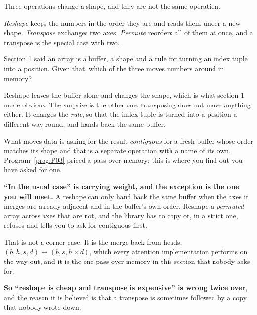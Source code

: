 \begin{fr}
Three operations change a shape, and they are not the same operation.

\emph{Reshape} keeps the numbers in the order they are and reads them under a
new shape. \emph{Transpose} exchanges two axes. \emph{Permute} reorders all of
them at once, and a transpose is the special case with two.

Section 1 said an array is a buffer, a shape and a rule for turning an index
tuple into a position. Given that, which of the three moves numbers around in
memory?
\dotline
\nextframe
\end{fr}

\begin{fr}
Reshape leaves the buffer alone and changes the shape, which is what section 1
made obvious. The surprise is the other one: transposing does not move anything
either. It changes the \emph{rule}, so that the index tuple is turned into a
position a different way round, and hands back the same buffer.

What moves data is asking for the result \emph{contiguous} \dash{} for a fresh
buffer whose order matches its shape \dash{} and that is a separate operation
with a name of its own. Program~\ref{prog:P03} priced a pass over memory; this
is where you find out you have asked for one.

\begin{warning}
\textbf{\enquote{In the usual case} is carrying weight, and the exception is
the one you will meet.} A reshape can only hand back the same buffer when the
axes it merges are already adjacent and in the buffer's own order. Reshape a
\emph{permuted} array across axes that are not, and the library has to copy
\dash{} or, in a strict one, refuses and tells you to ask for contiguous first.

That is not a corner case. It is the merge back from heads, $(b, h, s, d)
\rightarrow (b, s, h \times d)$, which every attention implementation performs
on the way out, and it is the one pass over memory in this section that nobody
asks for.
\end{warning}

\textbf{So \enquote{reshape is cheap and transpose is expensive} is wrong twice
over}, and the reason it is believed is that a transpose is sometimes followed
by a copy that nobody wrote down.
\end{fr}

